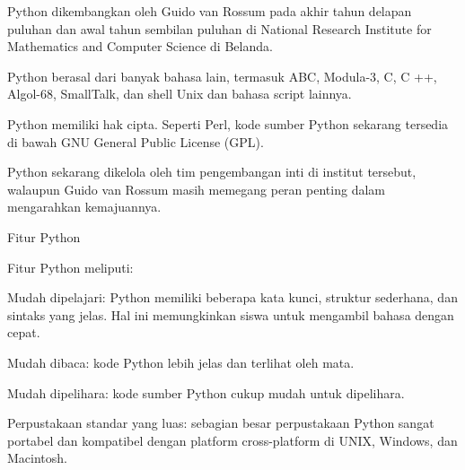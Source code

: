 \noindent 
{\fontsize{14pt}{14pt}\selectfont Python dikembangkan oleh Guido van Rossum pada akhir tahun delapan puluhan dan awal tahun sembilan puluhan di National Research Institute for Mathematics and Computer Science di Belanda. \\} \par
\vspace{14pt}
\noindent 
{\fontsize{14pt}{14pt}\selectfont Python berasal dari banyak bahasa lain, termasuk ABC, Modula-3, C, C ++, Algol-68, SmallTalk, dan shell Unix dan bahasa script lainnya. \\} \par
\vspace{14pt}
\noindent 
{\fontsize{14pt}{14pt}\selectfont Python memiliki hak cipta. Seperti Perl, kode sumber Python sekarang tersedia di bawah GNU General Public License (GPL). \\} \par
\vspace{14pt}
\noindent 
{\fontsize{14pt}{14pt}\selectfont Python sekarang dikelola oleh tim pengembangan inti di institut tersebut, walaupun Guido van Rossum masih memegang peran penting dalam mengarahkan kemajuannya. \\} \par
\vspace{14pt}
\noindent 
{\fontsize{14pt}{14pt}\selectfont Fitur Python \\} \par
\noindent 
{\fontsize{14pt}{14pt}\selectfont Fitur Python meliputi: \\} \par
\vspace{14pt}
\noindent 
{\fontsize{14pt}{14pt}\selectfont Mudah dipelajari: Python memiliki beberapa kata kunci, struktur sederhana, dan sintaks yang jelas. Hal ini memungkinkan siswa untuk mengambil bahasa dengan cepat. \\} \par
\vspace{14pt}
\noindent 
{\fontsize{14pt}{14pt}\selectfont Mudah dibaca: kode Python lebih jelas dan terlihat oleh mata. \\} \par
\vspace{14pt}
\noindent 
{\fontsize{14pt}{14pt}\selectfont Mudah dipelihara: kode sumber Python cukup mudah untuk dipelihara. \\} \par
\vspace{14pt}
\noindent 
{\fontsize{14pt}{14pt}\selectfont Perpustakaan standar yang luas: sebagian besar perpustakaan Python sangat portabel dan kompatibel dengan platform cross-platform di UNIX, Windows, dan Macintosh. \\} \par
